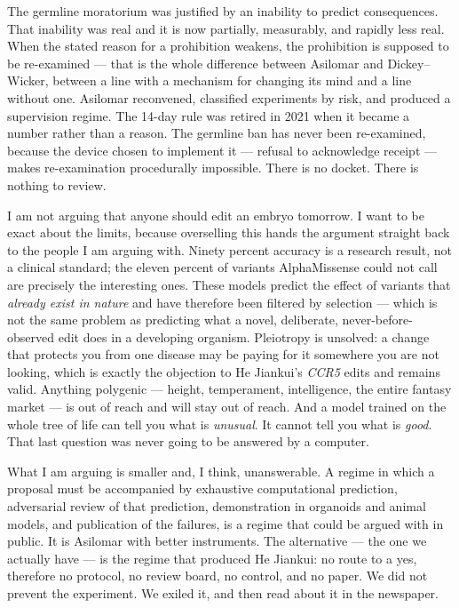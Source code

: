 The germline moratorium was justified by an inability to predict consequences. That inability was
real and it is now partially, measurably, and rapidly less real. When the stated reason for a
prohibition weakens, the prohibition is supposed to be re-examined --- that is the whole difference
between Asilomar and Dickey--Wicker, between a line with a mechanism for changing its mind and a line
without one. Asilomar reconvened, classified experiments by risk, and produced a supervision regime.
The 14-day rule was retired in 2021 when it became a number rather than a reason. The germline ban has
never been re-examined, because the device chosen to implement it --- refusal to acknowledge receipt
--- makes re-examination procedurally impossible. There is no docket. There is nothing to review.

I am not arguing that anyone should edit an embryo tomorrow. I want to be exact about the limits,
because overselling this hands the argument straight back to the people I am arguing with.
Ninety percent accuracy is a research result, not a clinical standard; the eleven percent of variants
AlphaMissense could not call are precisely the interesting ones. These models predict the effect of
variants that \emph{already exist in nature} and have therefore been filtered by selection --- which
is not the same problem as predicting what a novel, deliberate, never-before-observed edit does in a
developing organism. Pleiotropy is unsolved: a change that protects you from one disease may be paying
for it somewhere you are not looking, which is exactly the objection to He Jiankui's \emph{CCR5}
edits and remains valid. Anything polygenic --- height, temperament, intelligence, the entire fantasy
market --- is out of reach and will stay out of reach. And a model trained on the whole tree of life
can tell you what is \emph{unusual}. It cannot tell you what is \emph{good}. That last question was
never going to be answered by a computer.

What I am arguing is smaller and, I think, unanswerable.  A regime in which a proposal
must be accompanied by exhaustive computational prediction, adversarial review of that prediction,
demonstration in organoids and animal models, and publication of the failures, is a regime that could
be argued with in public. It is Asilomar with better instruments. The alternative --- the one we
actually have --- is the regime that produced He Jiankui: no route to a yes, therefore no protocol,
no review board, no control, and no paper. We did not prevent the experiment. We exiled it, and then
read about it in the newspaper.

